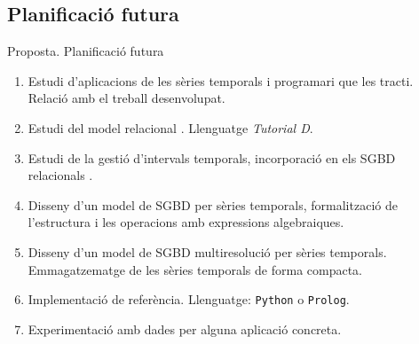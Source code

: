 \subsection{Planificació futura}
\begin{frame}{Proposta. Planificació futura}


  \begin{enumerate}

  \item Estudi d'aplicacions de les sèries temporals i programari que
    les tracti. Relació amb el treball desenvolupat.

  \item Estudi del model relacional \parencite{date:introduction,
      date06,date:dictionary, date:thethirdmanifesto}. Llenguatge
    \emph{Tutorial D}.

  \item Estudi de la gestió d'intervals temporals, incorporació en els
    SGBD relacionals \parencite{date02:_tempor_data_relat_model}.

  \item Disseny d'un model de SGBD per sèries temporals, formalització
    de l'estructura i les operacions amb expressions algebraiques.

  \item Disseny d'un model de SGBD multiresolució per sèries
    temporals. Emmagatzematge de les sèries temporals de forma compacta.

  \item Implementació de referència. Llenguatge: \texttt{Python} o
    \texttt{Prolog}.

  \item Experimentació amb dades per alguna aplicació concreta.

\end{enumerate}


\end{frame}



